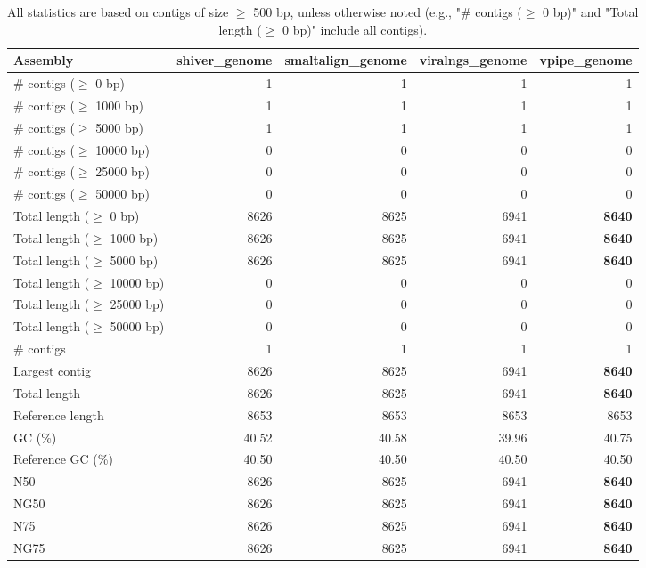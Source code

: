 \documentclass[12pt,a4paper]{article}
\begin{document}
\begin{table}[ht]
\begin{center}
\caption{All statistics are based on contigs of size $\geq$ 500 bp, unless otherwise noted (e.g., "\# contigs ($\geq$ 0 bp)" and "Total length ($\geq$ 0 bp)" include all contigs).}
\begin{tabular}{|l*{4}{|r}|}
\hline
Assembly & shiver\_genome & smaltalign\_genome & viralngs\_genome & vpipe\_genome \\ \hline
\# contigs ($\geq$ 0 bp) & 1 & 1 & 1 & 1 \\ \hline
\# contigs ($\geq$ 1000 bp) & 1 & 1 & 1 & 1 \\ \hline
\# contigs ($\geq$ 5000 bp) & 1 & 1 & 1 & 1 \\ \hline
\# contigs ($\geq$ 10000 bp) & 0 & 0 & 0 & 0 \\ \hline
\# contigs ($\geq$ 25000 bp) & 0 & 0 & 0 & 0 \\ \hline
\# contigs ($\geq$ 50000 bp) & 0 & 0 & 0 & 0 \\ \hline
Total length ($\geq$ 0 bp) & 8626 & 8625 & 6941 & {\bf 8640} \\ \hline
Total length ($\geq$ 1000 bp) & 8626 & 8625 & 6941 & {\bf 8640} \\ \hline
Total length ($\geq$ 5000 bp) & 8626 & 8625 & 6941 & {\bf 8640} \\ \hline
Total length ($\geq$ 10000 bp) & 0 & 0 & 0 & 0 \\ \hline
Total length ($\geq$ 25000 bp) & 0 & 0 & 0 & 0 \\ \hline
Total length ($\geq$ 50000 bp) & 0 & 0 & 0 & 0 \\ \hline
\# contigs & 1 & 1 & 1 & 1 \\ \hline
Largest contig & 8626 & 8625 & 6941 & {\bf 8640} \\ \hline
Total length & 8626 & 8625 & 6941 & {\bf 8640} \\ \hline
Reference length & 8653 & 8653 & 8653 & 8653 \\ \hline
GC (\%) & 40.52 & 40.58 & 39.96 & 40.75 \\ \hline
Reference GC (\%) & 40.50 & 40.50 & 40.50 & 40.50 \\ \hline
N50 & 8626 & 8625 & 6941 & {\bf 8640} \\ \hline
NG50 & 8626 & 8625 & 6941 & {\bf 8640} \\ \hline
N75 & 8626 & 8625 & 6941 & {\bf 8640} \\ \hline
NG75 & 8626 & 8625 & 6941 & {\bf 8640} \\ \hline

\end{tabular}
\end{center}
\end{table}
\end{document}
